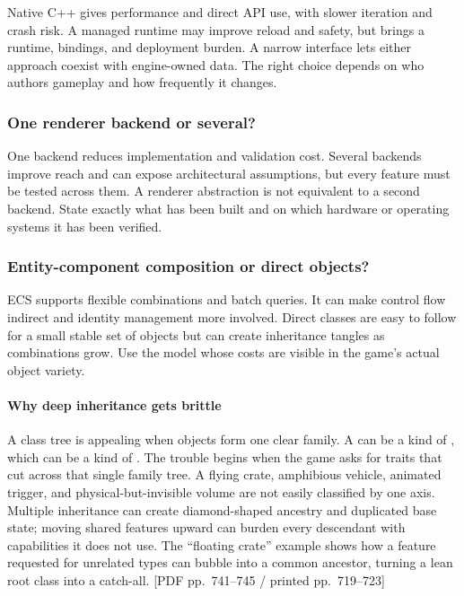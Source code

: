 \hypertarget{06-engine-ii-ch041-native-code-or-scriptable-behavior}{}

Native C++ gives performance and direct API use, with slower iteration and crash risk. A managed runtime may improve reload and safety, but brings a runtime, bindings, and deployment burden. A narrow interface lets either approach coexist with engine-owned data. The right choice depends on who authors gameplay and how frequently it changes.

\subsubsection{One renderer backend or several?}\label{06-engine-ii-ch041-one-renderer-backend-or-several}

\hypertarget{06-engine-ii-ch041-one-renderer-backend-or-several}{}

One backend reduces implementation and validation cost. Several backends improve reach and can expose architectural assumptions, but every feature must be tested across them. A renderer abstraction is not equivalent to a second backend. State exactly what has been built and on which hardware or operating systems it has been verified.

\subsubsection{Entity-component composition or direct objects?}\label{06-engine-ii-ch041-entity-component-composition-or-direct-objects}

\hypertarget{06-engine-ii-ch041-entity-component-composition-or-direct-objects}{}

ECS supports flexible combinations and batch queries. It can make control flow indirect and identity management more involved. Direct classes are easy to follow for a small stable set of objects but can create inheritance tangles as combinations grow. Use the model whose costs are visible in the game's actual object variety.

\paragraph{Why deep inheritance gets brittle}\label{06-engine-ii-ch041-why-deep-inheritance-gets-brittle}

\hypertarget{06-engine-ii-ch041-why-deep-inheritance-gets-brittle}{}

A class tree is appealing when objects form one clear family. A  can be a kind of , which can be a kind of . The trouble begins when the game asks for traits that cut across that single family tree. A flying crate, amphibious vehicle, animated trigger, and physical-but-invisible volume are not easily classified by one axis. Multiple inheritance can create diamond-shaped ancestry and duplicated base state; moving shared features upward can burden every descendant with capabilities it does not use. The ``floating crate'' example shows how a feature requested for unrelated types can bubble into a common ancestor, turning a lean root class into a catch-all. {[}PDF pp.~741--745 / printed pp.~719--723{]}

